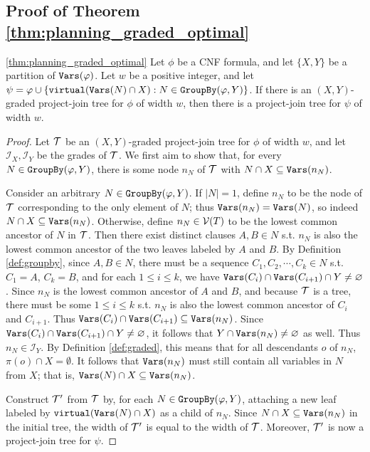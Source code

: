 \subsection{Proof of Theorem \ref{thm:planning_graded_optimal}}
\begin{theorem}{\ref{thm:planning_graded_optimal}}
Let $\phi$ be a CNF formula, and let $\{X, Y\}$ be a partition of $\texttt{\upshape Vars}(\varphi)$.
Let $w$ be a positive integer, and let $\psi = \varphi \cup \{\texttt{\upshape virtual}(\texttt{\upshape Vars}(N)\cap X) : N \in \texttt{\upshape GroupBy}(\varphi, Y)\}$. %
If there is an $(X,Y)$-graded project-join tree for $\phi$ of width $w$, then there is a project-join tree for $\psi$ of width $w$.
\end{theorem}
\begin{proof}
Let $\mathcal{T}$ be an $(X,Y)$-graded project-join tree for $\phi$ of width $w$, and let $\mathcal{I}_X, \mathcal{I}_Y$ be the grades of $\mathcal{T}$. 
We first aim to show that, for every $N \in \texttt{\upshape GroupBy}(\varphi, Y)$, there is some node $n_N$ of $\mathcal{T}$ with $N \cap X \subseteq \texttt{\upshape Vars}(n_N)$. 

Consider an arbitrary $N \in \texttt{\upshape GroupBy}(\varphi, Y)$. If $|N| = 1$, define $n_N$ to be the node of $\mathcal{T}$ corresponding to the only element of $N$; thus $\texttt{\upshape Vars}(n_N) = \texttt{\upshape Vars}(N)$, so indeed $N \cap X \subseteq \texttt{\upshape Vars}(n_N)$. 
Otherwise, define $n_N \in \mathcal{V}(T)$ to be the lowest common ancestor of $N$ in $\mathcal{T}$. 
Then there exist distinct clauses $A, B \in N$ s.t. $n_N$ is also the lowest common ancestor of the two leaves labeled by $A$ and $B$. 
By Definition \ref{def:groupby}, since $A, B \in N$, there must be a sequence $C_1, C_2, \cdots, C_k \in N$ s.t. $C_1 = A$, $C_k = B$, and for each $1 \leq i \leq k$, we have $\texttt{\upshape Vars}(C_i) \cap \texttt{\upshape Vars}(C_{i+1}) \cap Y \neq \varnothing$. 
Since $n_N$ is the lowest common ancestor of $A$ and $B$, and because $\mathcal{T}$ is a tree, there must be some $1 \leq i \leq k$ s.t. $n_N$ is also the lowest common ancestor of $C_i$ and $C_{i+1}$. Thus $\texttt{\upshape Vars}(C_i) \cap \texttt{\upshape Vars}(C_{i+1}) \subseteq \texttt{\upshape Vars}(n_N)$. 
Since $\texttt{\upshape Vars}(C_i) \cap \texttt{\upshape Vars}(C_{i+1}) \cap Y \neq \varnothing$, it follows that $Y \cap \texttt{\upshape Vars}(n_N) \neq \varnothing$ as well. Thus $n_N \in \mathcal{I}_Y$. By Definition \ref{def:graded}, this means that for all descendants $o$ of $n_N$, $\pi(o) \cap X = \emptyset$. It follows that $\texttt{\upshape Vars}(n_N)$ must still contain all variables in $N$ from $X$; that is, $\texttt{\upshape Vars}(N) \cap X \subseteq \texttt{\upshape Vars}(n_N)$.

Construct $\mathcal{T}'$ from $\mathcal{T}$ by, for each $N \in \texttt{\upshape GroupBy}(\varphi, Y)$, attaching a new leaf labeled by $\texttt{\upshape virtual}(\texttt{\upshape Vars}(N) \cap X)$ as a child of $n_N$. 
Since $N \cap X \subseteq \texttt{\upshape Vars}(n_N)$ in the initial tree, the width of $\mathcal{T}'$ is equal to the width of $\mathcal{T}$. Moreover, $\mathcal{T}'$ is now a project-join tree for $\psi$.
\end{proof}
